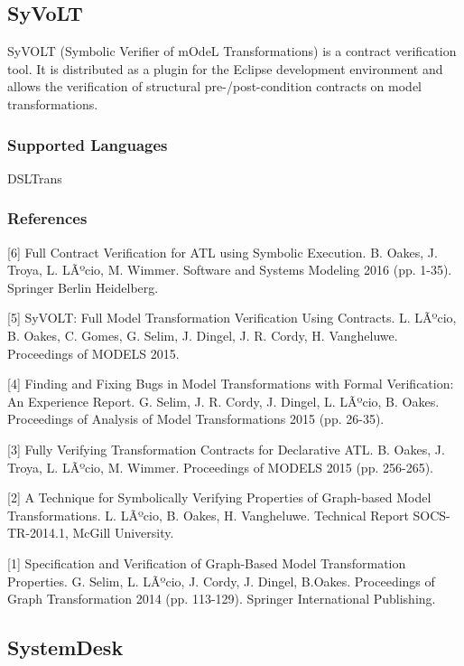 \subsection{SyVoLT}
\label{subsecT:SyVoLT}


SyVOLT (Symbolic Verifier of mOdeL Transformations) is a contract verification tool.
It is distributed as a plugin for the Eclipse development environment and allows the verification of structural pre-/post-condition contracts on model transformations. 

\subsubsection{Supported Languages}

DSLTrans


\subsubsection{References}


[6] Full Contract Verification for ATL using Symbolic Execution. B. Oakes, J. Troya, L. LÃºcio, M. Wimmer. Software and Systems Modeling 2016 (pp. 1-35). Springer Berlin Heidelberg. 

[5] SyVOLT: Full Model Transformation Verification Using Contracts. L. LÃºcio, B. Oakes, C. Gomes, G. Selim, J. Dingel, J. R. Cordy, H. Vangheluwe. Proceedings of MODELS 2015.

[4] Finding and Fixing Bugs in Model Transformations with Formal Verification: An Experience Report. G. Selim, J. R. Cordy, J. Dingel, L. LÃºcio, B. Oakes. Proceedings of Analysis of Model Transformations 2015 (pp. 26-35).

[3] Fully Verifying Transformation Contracts for Declarative ATL. B. Oakes, J. Troya, L. LÃºcio, M. Wimmer. Proceedings of MODELS 2015 (pp. 256-265).

[2] A Technique for Symbolically Verifying Properties of Graph-based Model Transformations. L. LÃºcio, B. Oakes, H. Vangheluwe. Technical Report SOCS-TR-2014.1, McGill University.

[1] Specification and Verification of Graph-Based Model Transformation Properties. G. Selim, L. LÃºcio, J. Cordy, J. Dingel, B.Oakes. Proceedings of Graph Transformation 2014 (pp. 113-129). Springer International Publishing.



\subsection{SystemDesk}
\label{subsecT:SystemDesk}

